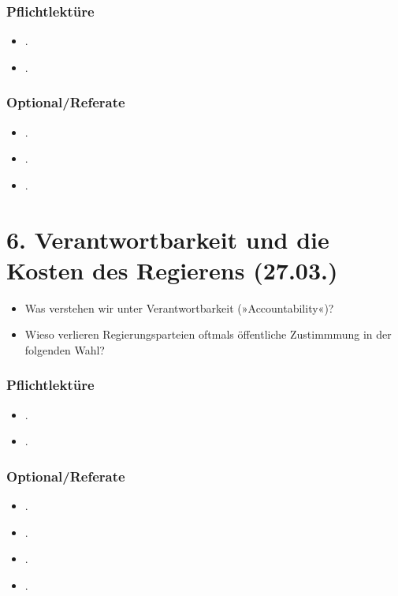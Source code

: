 \documentclass[abstract=on,parskip=full,headings=standardclasses,fontsize=11pt,paper=a4]{scrartcl}
\begin{document}
\subsubsection*{Pflichtlektüre}
\begin{itemize}
\item {}.
\item {}.
\end{itemize}


\subsubsection*{Optional/Referate}
\begin{itemize}
\item {}.
\item {}.
\item {}.
\end{itemize}


\section{6. Verantwortbarkeit und die Kosten des Regierens (27.03.)}

\begin{itemize}
\renewcommand\labelitemi{--}
\item Was verstehen wir unter Verantwortbarkeit (»Accountability«)?
\item Wieso verlieren Regierungsparteien oftmals öffentliche Zustimmmung in der folgenden Wahl?
\end{itemize}

\subsubsection*{Pflichtlektüre}

\begin{itemize}
\item {}.
\item {}.
\end{itemize}


\subsubsection*{Optional/Referate}
\begin{itemize}
\item {}.
\item {}.
\item {}.
\item {}.
\end{itemize}
\end{document}
